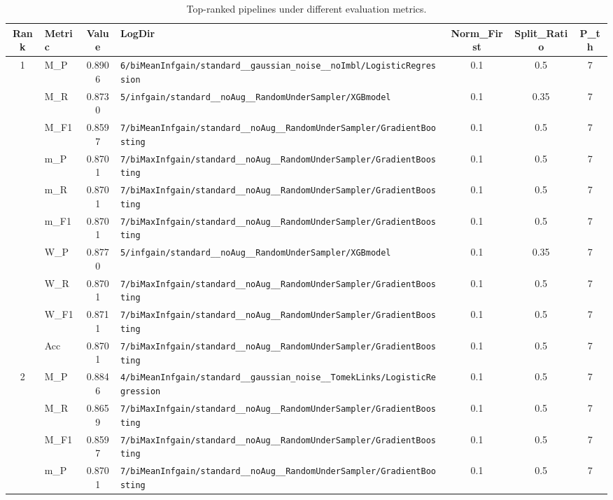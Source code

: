 \begin{table}[htbp]
\caption{Top-ranked pipelines under different evaluation metrics.}
\label{tab:rank_metric_vertical}
\centering
\small
\setlength{\tabcolsep}{4pt}
\begin{tabular}{|c|l|c|>{\ttfamily\footnotesize}p{7.2cm}|c|c|c|}
\hline
Rank & Metric & Value & LogDir & Norm\_First & Split\_Ratio & P\_th \\
\hline
\multirow{10}{*}{1} & M\_P & 0.8906 & \texttt{6/biMeanInfgain/standard\_\_gaussian\_noise\_\_noImbl/LogisticRegression} & 0.1 & 0.5  & 7 \\ 
 & M\_R & 0.8730 & \texttt{5/infgain/standard\_\_noAug\_\_RandomUnderSampler/XGBmodel} & 0.1 & 0.35  & 7 \\ 
 & M\_F1 & 0.8597 & \texttt{7/biMeanInfgain/standard\_\_noAug\_\_RandomUnderSampler/GradientBoosting} & 0.1 & 0.5  & 7 \\ 
 & m\_P & 0.8701 & \texttt{7/biMaxInfgain/standard\_\_noAug\_\_RandomUnderSampler/GradientBoosting} & 0.1 & 0.5  & 7 \\ 
 & m\_R & 0.8701 & \texttt{7/biMaxInfgain/standard\_\_noAug\_\_RandomUnderSampler/GradientBoosting} & 0.1 & 0.5  & 7 \\ 
 & m\_F1 & 0.8701 & \texttt{7/biMaxInfgain/standard\_\_noAug\_\_RandomUnderSampler/GradientBoosting} & 0.1 & 0.5  & 7 \\ 
 & W\_P & 0.8770 & \texttt{5/infgain/standard\_\_noAug\_\_RandomUnderSampler/XGBmodel} & 0.1 & 0.35  & 7 \\ 
 & W\_R & 0.8701 & \texttt{7/biMaxInfgain/standard\_\_noAug\_\_RandomUnderSampler/GradientBoosting} & 0.1 & 0.5  & 7 \\ 
 & W\_F1 & 0.8711 & \texttt{7/biMaxInfgain/standard\_\_noAug\_\_RandomUnderSampler/GradientBoosting} & 0.1 & 0.5  & 7 \\ 
 & Acc & 0.8701 & \texttt{7/biMaxInfgain/standard\_\_noAug\_\_RandomUnderSampler/GradientBoosting} & 0.1 & 0.5  & 7 \\ 
\hline
\multirow{10}{*}{2} & M\_P & 0.8846 & \texttt{4/biMeanInfgain/standard\_\_gaussian\_noise\_\_TomekLinks/LogisticRegression} & 0.1 & 0.5  & 7 \\ 
 & M\_R & 0.8659 & \texttt{7/biMaxInfgain/standard\_\_noAug\_\_RandomUnderSampler/GradientBoosting} & 0.1 & 0.5  & 7 \\ 
 & M\_F1 & 0.8597 & \texttt{7/biMaxInfgain/standard\_\_noAug\_\_RandomUnderSampler/GradientBoosting} & 0.1 & 0.5  & 7 \\ 
 & m\_P & 0.8701 & \texttt{7/biMeanInfgain/standard\_\_noAug\_\_RandomUnderSampler/GradientBoosting} & 0.1 & 0.5  & 7 \\ 

\end{tabular}
\end{table}
